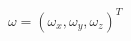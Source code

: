 \documentclass[preview]{standalone}
\begin{document}
\begin{center}
$\omega = (\omega_x, \omega_y, \omega_z)^T$
\end{center}
\end{document}
